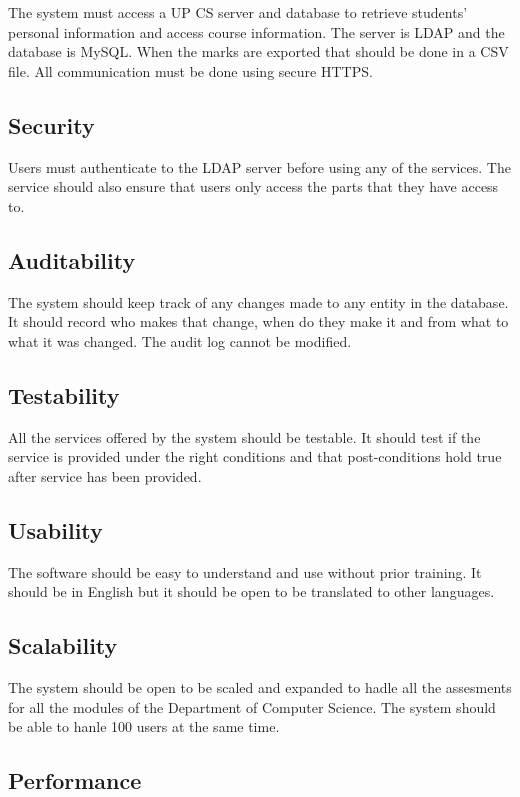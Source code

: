 \documentclass[a4paper]{article}
\begin{document}
The system must access a UP CS server and database to retrieve students' personal information and access course information. The server is LDAP and the database is MySQL. When the marks are exported that should be done in a CSV file. All communication must be done using secure HTTPS.

\subsection{Security}

Users must authenticate to the LDAP server before using any of the services. The service should also ensure that users only access the parts that they have access to. 
	
\subsection{Auditability}

The system should keep track of any changes made to any entity in the database. It should record who makes that change, when do they make it and from what to what it was changed. The audit log cannot be modified.

\subsection{Testability}

All the services offered by the system should be testable. It should test if the service is provided under the right conditions and that post-conditions hold true after service has been provided. 

\subsection{Usability}

The software should be easy to understand and use without prior training. It should be in English but it should be open to be translated to other languages.

\subsection{Scalability}

The system should be open to be scaled and expanded to hadle all the assesments for all the modules of the Department of Computer Science. The system should be able to hanle 100 users at the same time.
	
\subsection{Performance}
\end{document}
